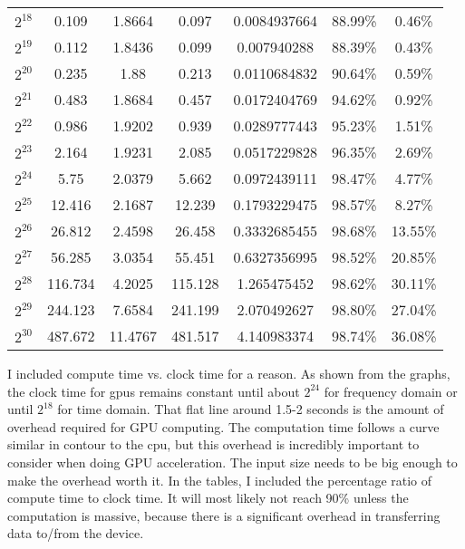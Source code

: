 \begin{center}
\begin{landscape}
\begin{tabular}{c|c|c|c|c|c|c}
$2^{18}$ & 0.109 & 1.8664 & 0.097 & 0.0084937664 & 88.99\% & 0.46\% \\ 
$2^{19}$ & 0.112 & 1.8436 & 0.099 & 0.007940288 & 88.39\% & 0.43\% \\ 
$2^{20}$ & 0.235 & 1.88 & 0.213 & 0.0110684832 & 90.64\% & 0.59\% \\ 
$2^{21}$ & 0.483 & 1.8684 & 0.457 & 0.0172404769 & 94.62\% & 0.92\% \\ 
$2^{22}$ & 0.986 & 1.9202 & 0.939 & 0.0289777443 & 95.23\% & 1.51\% \\ 
$2^{23}$ & 2.164 & 1.9231 & 2.085 & 0.0517229828 & 96.35\% & 2.69\% \\ 
$2^{24}$ & 5.75 & 2.0379 & 5.662 & 0.0972439111 & 98.47\% & 4.77\% \\ 
$2^{25}$ & 12.416 & 2.1687 & 12.239 & 0.1793229475 & 98.57\% & 8.27\% \\ 
$2^{26}$ & 26.812 & 2.4598 & 26.458 & 0.3332685455 & 98.68\% & 13.55\% \\ 
$2^{27}$ & 56.285 & 3.0354 & 55.451 & 0.6327356995 & 98.52\% & 20.85\% \\ 
$2^{28}$ & 116.734 & 4.2025 & 115.128 & 1.265475452 & 98.62\% & 30.11\% \\ 
$2^{29}$ & 244.123 & 7.6584 & 241.199 & 2.070492627 & 98.80\% & 27.04\% \\ 
$2^{30}$ & 487.672 & 11.4767 & 481.517 & 4.140983374 & 98.74\% & 36.08\% \\ 
    \end{tabular}
    
\end{landscape}
\newpage
\end{center}
I included compute time vs. clock time for a reason. As shown from the graphs, the clock time for \glspl{gpu} remains constant until about $2^{24}$ for frequency domain or until $2^{18}$ for time domain. That flat line around 1.5-2 seconds is the amount of overhead required for GPU computing. The computation time follows a curve similar in contour to the \gls{cpu}, but this overhead is incredibly important to consider when doing GPU acceleration. The input size needs to be big enough to make the overhead worth it. In the tables, I included the percentage ratio of compute time to clock time. It will most likely not reach 90\% unless the computation is massive, because there is a significant overhead in transferring data to/from the device. 